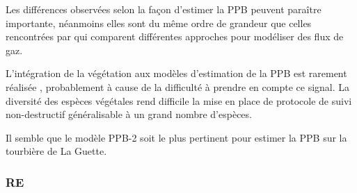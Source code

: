 Les différences observées selon la façon d'estimer la PPB peuvent paraître importante, néanmoins elles sont du même ordre de grandeur que celles rencontrées par \citet{worrall2009} qui comparent différentes approches pour modéliser des flux de gaz.

L'intégration de la végétation aux modèles d'estimation de la PPB est rarement réalisée \citep{bortoluzzi2006a,gorres2014}, probablement à cause de la difficulté à prendre en compte ce signal.
La diversité des espèces végétales rend difficile la mise en place de protocole de suivi non-destructif généralisable à un grand nombre d'espèces.

Il semble que le modèle PPB-2 soit le plus pertinent pour estimer la PPB sur la tourbière de La Guette.

%



\subsubsection{RE}


